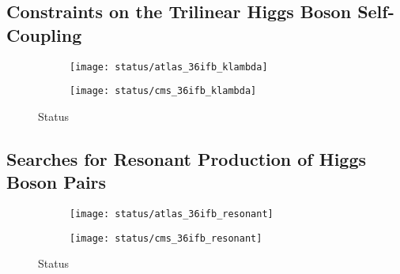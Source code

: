 \subsection{Constraints on the Trilinear Higgs Boson Self-Coupling}

\begin{figure}[htbp]
  \centering

  \begin{subfigure}[b]{0.48\textwidth}
    \centering

    \texttt{[image: status/atlas\_36ifb\_klambda]}

  \end{subfigure}\hfill%
  \begin{subfigure}[b]{0.48\textwidth}
    \centering

    \texttt{[image: status/cms\_36ifb\_klambda]}

  \end{subfigure}

  \caption{Status}
  \label{fig:prior_status_klambda}
\end{figure}


\subsection{Searches for Resonant Production of Higgs Boson Pairs}


\begin{figure}[htbp]
  \centering

  \begin{subfigure}[b]{0.40\textwidth}
    \centering

    \texttt{[image: status/atlas\_36ifb\_resonant]}

  \end{subfigure}\hfill%
  \begin{subfigure}[b]{0.56\textwidth}
    \centering

    \texttt{[image: status/cms\_36ifb\_resonant]}

  \end{subfigure}

  \caption{Status}
  \label{fig:prior_status_klambda}
\end{figure}


